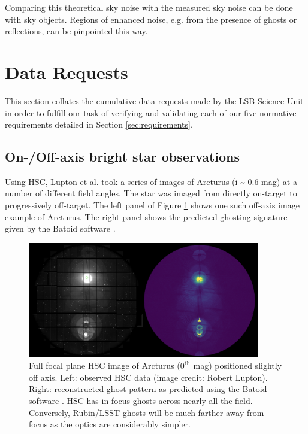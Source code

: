 \documentclass[SE,authoryear,toc]{lsstdoc}
\begin{document}
Comparing this theoretical sky noise with the measured sky noise can be done with sky objects.
Regions of enhanced noise, e.g. from the presence of ghosts or reflections, can be pinpointed this way.

\newpage





\section{Data Requests}  \label{sec:requests}

This section collates the cumulative data requests made by the LSB Science Unit in order to fulfill our task of verifying and validating each of our five normative requirements detailed in Section \ref{sec:requirements}.





\subsection{On-/Off-axis bright star observations}  \label{sec:brightstar}

Using HSC, Lupton et al. took a series of images of Arcturus (i \sim -0.6 mag) at a number of different field angles.
The star was imaged from directly on-target to progressively off-target.
The left panel of Figure \ref{fig:ghosts_arcturus_crop} shows one such off-axis image example of Arcturus.
The right panel shows the predicted ghosting signature given by the Batoid software \citep{Meyers2019}.

\begin{figure}
\centering
\includegraphics[width=0.9\textwidth]{fig/ghosts_arcturus_crop}
\caption{
Full focal plane HSC image of Arcturus ($0^{\mathrm{th}}$ mag) positioned slightly off axis.
Left: observed HSC data (image credit: Robert Lupton).
Right: reconstructed ghost pattern as predicted using the Batoid software \citep[image credit: ][]{Meyers2019}.
HSC has in-focus ghosts across nearly all the field.
Conversely, Rubin/LSST ghosts will be much farther away from focus as the optics are considerably simpler.
}
\label{fig:ghosts_arcturus_crop}
\end{figure}
\end{document}

